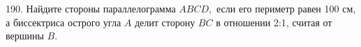 190. Найдите стороны параллелограмма $ABCD,$ если его периметр равен 100 см, а биссектриса острого угла $A$ делит сторону $BC$ в отношении 2:1, считая от вершины $B.$\\
